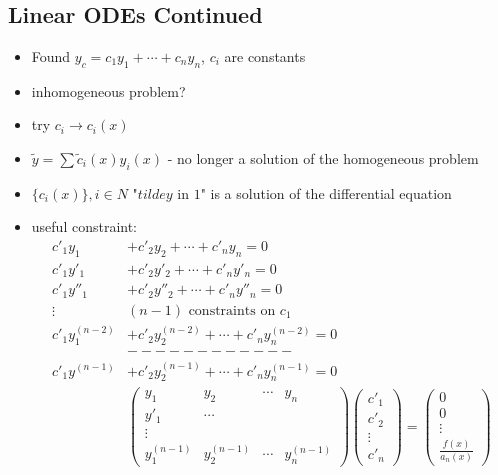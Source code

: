 \documentclass[Maths.tex]{subfiles}
\begin{document}
\chapter{}
\section{Linear ODEs Continued}
\begin{itemize}
    \item Found $y_c = c_1y_1 + \cdots + c_ny_n$, $c_i$ are constants
    \item inhomogeneous problem?
    \item try $c_i \to c_i(x)$
    \item $\tilde{y} = \sum \tilde{c}_i(x)y_i(x)$ - no longer a solution of the homogeneous problem
    \item $\{c_i(x)\}, i \in N$ "$tilde{y}$ in $1$" is a solution of the differential equation
    \item useful constraint:
    \begin{align}
        c'_1y_1 &+ c'_2y_2 + \cdots + c'_ny_n = 0 \\
        c'_1y'_1 &+ c'_2y'_2 + \cdots + c'_ny'_n = 0 \\
        c'_1y''_1 &+ c'_2y''_2 + \cdots + c'_ny''_n = 0 \\
        \vdots ~ &(n-1) \text{ constraints on }c_1 \\
        c'_1y^{(n-2)}_1 &+ c'_2y^{(n-2)}_2 + \cdots + c'_ny^{(n-2)}_n = 0 \\
        & ------------ \\
        c'_1y^{(n-1)} &+ c'_2y^{(n-1)}_2 + \cdots + c'_ny^{(n-1)}_n = 0 \\
        &\begin{pmatrix} y_1 & y_2 & \cdots & y_n \\ y'_1 & \cdots & & \\ \vdots & & & \\ y_1^{(n-1)} & y_2^{(n-1)} & \cdots & y_n^{(n-1)}\end{pmatrix} \begin{pmatrix} c'_1 \\ c'_2 \\ \vdots \\ c'_n \end{pmatrix} = \begin{pmatrix} 0 \\ 0 \\ \vdots \\ \frac{f(x)}{a_n(x)} \end{pmatrix}
    \end{align}
\end{itemize}
\end{document}
